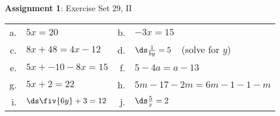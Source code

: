 \documentclass[12pt]{letter}
\begin{document}
\textbf{Assignment 1}: Exercise Set 29, II

\begin{tabular}{rlrl}
a.& $5x=20$ & b. & $-3x=15$\\
c.& $8x+48=4x-12$ & d. & $\ds\frac{1}{by}=5$\ \ (solve for $y$)\\
e.& $5x+ -10-8x=15$ & f. & $5-4a=a-13$\\
g.& $5x+2=22$ & h.& $5m-17-2m=6m-1-1-m$\\
i.& $\ds\fiv{6y}+3=12$ & j. & $\ds\frac 5x=2$
\end{tabular}
\end{document}
